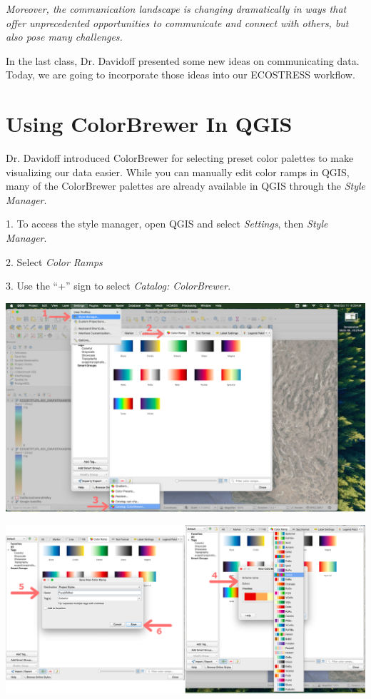 \documentclass[oneside,a4paper,11pt,explicit]{book}
\begin{document}
{\begin{minipage}{.9665\textwidth}
	\vspace{.5em}

	\textit{Moreover, the communication landscape is changing dramatically in ways that offer unprecedented opportunities to communicate and connect with others, but also pose many challenges.}

	\vspace{.5em}

	In the last class, Dr. Davidoff presented some new ideas on communicating data. Today, we are going to incorporate those ideas into our ECOSTRESS workflow.
	
\end{minipage}}

\section{Using ColorBrewer In QGIS}

Dr. Davidoff introduced ColorBrewer for selecting preset color palettes to make visualizing our data easier. While you can manually edit color ramps in QGIS, many of the ColorBrewer palettes are already available in QGIS through the \textit{Style Manager}. 

1. To access the style manager, open QGIS and select \textit{Settings}, then \textit{Style Manager}.

2. Select \textit{Color Ramps}

3. Use the ``+'' sign to select \textit{Catalog: ColorBrewer}.

\centerline{\includegraphics[width=.87\textwidth]{StyleManager.png}}

\vspace{.5em}

\centerline{\includegraphics[width=.87\textwidth]{QGIScolorBrewer.png}}
\end{document}
